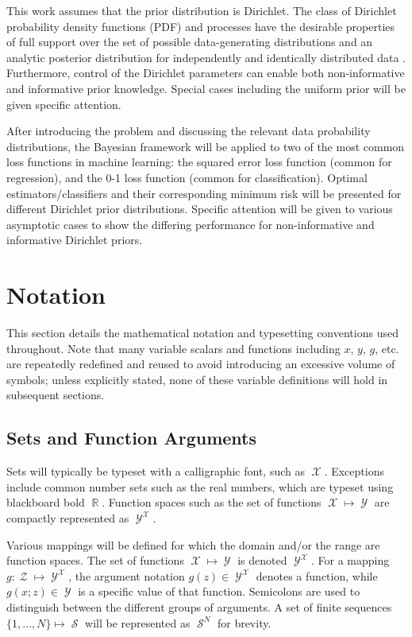 \documentclass[12pt]{report}
\DeclareMathOperator{\Xcal}{\mathcal{X}}
\DeclareMathOperator{\Ycal}{\mathcal{Y}}
\DeclareMathOperator{\Zcal}{\mathcal{Z}}
\DeclareMathOperator{\Scal}{\mathcal{S}}
\DeclareMathOperator{\Rbb}{\mathbb{R}}
\begin{document}
This work assumes that the prior distribution is Dirichlet. The class of Dirichlet probability density functions (PDF) and processes have the desirable properties of full support over the set of possible data-generating distributions and an analytic posterior distribution for independently and identically distributed data \cite{ferguson}. Furthermore, control of the Dirichlet parameters can enable both non-informative and informative prior knowledge. Special cases including the uniform prior will be given specific attention.

After introducing the problem and discussing the relevant data probability distributions, the Bayesian framework will be applied to two of the most common loss functions in machine learning: the squared error loss function (common for regression), and the 0-1 loss function \cite{berger} (common for classification). Optimal estimators/classifiers and their corresponding minimum risk will be presented for different Dirichlet prior distributions. Specific attention will be given to various asymptotic cases to show the differing performance for non-informative and informative Dirichlet priors.




\section{Notation}

This section details the mathematical notation and typesetting conventions used throughout. Note that many variable scalars and functions including $x$, $y$, $g$, etc. are repeatedly redefined and reused to avoid introducing an excessive volume of symbols; unless explicitly stated, none of these variable definitions will hold in subsequent sections.


\subsection*{Sets and Function Arguments}

Sets will typically be typeset with a calligraphic font, such as $\Xcal$. Exceptions include common number sets such as the real numbers, which are typeset using blackboard bold $\Rbb$. Function spaces such as the set of functions $\Xcal \mapsto \Ycal$ are compactly represented as $\Ycal^{\Xcal}$.

Various mappings will be defined for which the domain and/or the range \cite{rudin} are function spaces. The set of functions $\Xcal \mapsto \Ycal$ is denoted $\Ycal^{\Xcal}$. For a mapping $g : \Zcal \mapsto \Ycal^{\Xcal}$, the argument notation $g(z) \in \Ycal^{\Xcal}$ denotes a function, while $g(x;z) \in \Ycal$ is a specific value of that function. Semicolons are used to distinguish between the different groups of arguments. A set of finite sequences $\{1,\ldots,N\} \mapsto \Scal$ will be represented as $\Scal^N$ for brevity.
\end{document}
